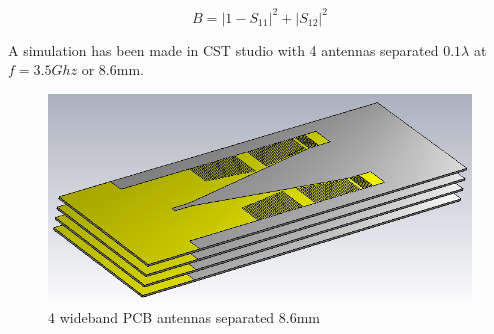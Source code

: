 \begin{equation} 
B = |1-S_{11}|^2 + |S_{12}|^2
\end{equation}

A simulation has been made in CST studio with 4 antennas separated $0.1\lambda$ at $f = 3.5Ghz$ or 8.6mm.


\begin{figure}[H]
\centering 
\includegraphics[scale = 0.7]{figures/ch1/antenna_array.png}
\caption{4 wideband PCB antennas separated 8.6mm }
\label{fig:correlation}
\end{figure}






